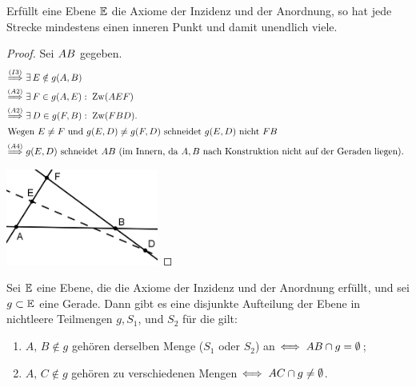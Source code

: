 
\begin{thm}
    Erfüllt eine Ebene $\mathbb E$ die Axiome der Inzidenz und der Anordnung, so hat jede Strecke
    mindestens einen inneren Punkt und damit unendlich viele.
\end{thm}

\begin{proof}
    Sei ${AB}$ gegeben.
    \begin{align*}
        \stackrel{(I3)}{\Longrightarrow}\ & \exists\,E\notin g(A,B)\\
        \stackrel{(A2)}{\Longrightarrow}\ & \exists\,F\in g(A,E):\;\operatorname{Zw}(AEF)\\
        \stackrel{(A2)}{\Longrightarrow}\ & \exists\,D\in g(F,B):\;\operatorname{Zw}(FBD).\\
        \intertext{Wegen $E\neq F$ und $g(E,D)\neq g(F,D)$ schneidet $g(E,D)$ nicht ${FB}$}
        \stackrel{(A4)}{\Longrightarrow}\ & g(E,D) \text{ schneidet } {AB} \text{ (im Innern, da
        $A,B$ nach Konstruktion nicht auf der Geraden liegen). }
    \end{align*}

    \centerline{\includegraphics[width=5cm]{BILDER/1-1-05-Satz.png}}
\end{proof}


\begin{thm}\label{thm:satz.s1a}
    Sei $\mathbb E$ eine Ebene, die die Axiome der Inzidenz und der Anordnung erfüllt, und sei $g \subset
    \mathbb E$ eine Gerade. Dann gibt es eine disjunkte Aufteilung der Ebene in nichtleere Teilmengen $g,
    S_1$, und $S_2$ für die gilt:

    \renewcommand{\labelenumi}{\alph{enumi})} %
    \begin{enumerate}
        \item $A,\, B \notin g$ gehören derselben Menge ($S_1$ oder $S_2$) an
            $\Longleftrightarrow\; {AB} \cap g = \emptyset$;

        \item $A,\, C \notin g$ gehören zu verschiedenen Mengen $\Longleftrightarrow\;
            {AC} \cap g \neq \emptyset$.
    \end{enumerate}
\end{thm}

